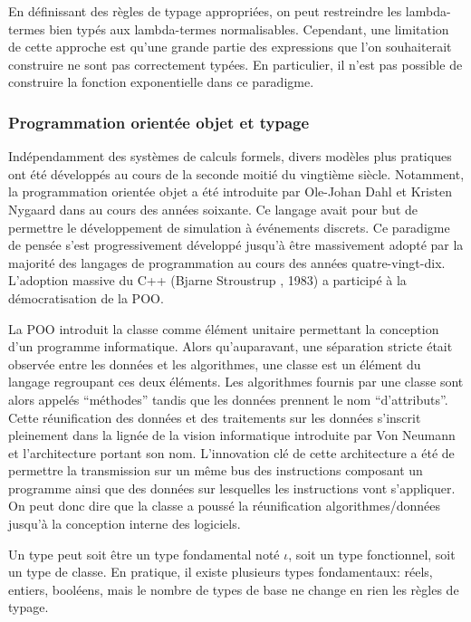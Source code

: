 En définissant des règles de typage appropriées, on peut restreindre
les lambda-termes bien typés aux lambda-termes
normalisables. Cependant, une limitation de cette approche est qu'une
grande partie des expressions que l'on souhaiterait construire ne sont
pas correctement typées. En particulier, il n'est pas possible de
construire la fonction exponentielle dans ce paradigme.


\subsubsection{Programmation orientée objet et typage}
\label{sec:chap1_model2impl_typage_poo}

Indépendamment des systèmes de calculs formels, divers modèles plus
pratiques ont été développés au cours de la seconde moitié du
vingtième siècle. Notamment, la programmation orientée objet
 a été introduite par Ole-Johan
Dahl  et Kristen Nygaard 
dans  au cours des années soixante. Ce langage avait
pour but de permettre le développement de simulation à événements
discrets. Ce paradigme de pensée s'est progressivement développé
jusqu'à être massivement adopté par la majorité des langages de
programmation au cours des années quatre-vingt-dix. L'adoption massive
du C++ (Bjarne Stroustrup , 1983) a participé
à la démocratisation de la POO.


La POO introduit la classe comme élément unitaire permettant la
conception d'un programme informatique. Alors qu'auparavant, une
séparation stricte était observée entre les données et les
algorithmes, une classe est un élément du langage regroupant ces deux
éléments. Les algorithmes fournis par une classe sont alors appelés
``méthodes'' tandis que les données prennent le nom
``d'attributs''. Cette réunification des données et des traitements
sur les données s'inscrit pleinement dans la lignée de la vision
informatique introduite par Von Neumann et l'architecture portant son
nom. L'innovation clé de cette architecture a été de permettre la
transmission sur un même bus des instructions composant un programme
ainsi que des données sur lesquelles les instructions vont
s'appliquer. On peut donc dire que la classe a poussé la réunification
algorithmes/données jusqu'à la conception interne des logiciels.

\begin{mydef}\label{def:chap1_type}
  Un type peut soit être un type fondamental noté $\iota$, soit un
  type fonctionnel, soit un type de classe. En pratique, il existe
  plusieurs types fondamentaux: réels, entiers, booléens, mais le
  nombre de types de base ne change en rien les règles de typage.
\end{mydef}

